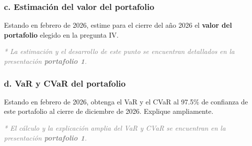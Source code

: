 \subsubsection*{{c. Estimación del valor del portafolio}}
Estando en febrero de 2026, estime para el cierre del año 2026 el \textbf{valor del portafolio} elegido en la pregunta IV.
    
\vspace{0.2cm}
\noindent \textcolor{gray}{\textit{* La estimación y el desarrollo de este punto se encuentran detallados en la presentación \textbf{portafolio 1}.}}

\vspace{0.5cm}

\subsubsection*{{d. VaR y CVaR del portafolio}}
Estando en febrero de 2026, obtenga el VaR y el CVaR al 97.5\% de confianza de este portafolio al cierre de diciembre de 2026. Explique ampliamente.
    
\vspace{0.2cm}
\noindent \textcolor{gray}{\textit{* El cálculo y la explicación amplia del VaR y CVaR se encuentran en la presentación \textbf{portafolio 1}.}}
